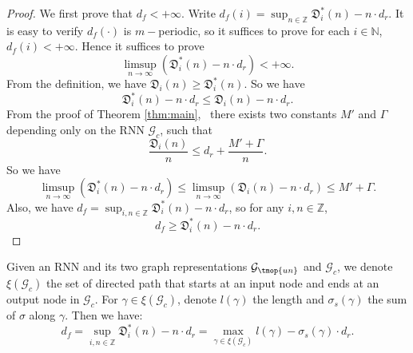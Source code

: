 \begin{proof}
  We first prove that $d_f < + \infty$. Write $d_f (i) = \sup_{n \in
  \mathbb{Z}} \mathfrak{D}_i^{\ast} (n) - n \cdot d_r$. It is easy to verify
  $d_f (\cdot)$ is $m -$periodic, so it suffices to prove for each $i \in
  \mathbb{N}$, $d_f (i) < + \infty$. Hence it suffices to prove
  \[ \limsup_{n \rightarrow \infty} (\mathfrak{D}_i^{\ast} (n) - n \cdot d_r)
     < + \infty. \]
  From the definition, we have
  $\mathfrak{D}_i (n) \geq \mathfrak{D}_i^{\ast} (n).$
  So we have
  \[ \mathfrak{D}_i^{\ast} (n) - n \cdot d_r \leq \mathfrak{D}_i (n) - n
     \cdot d_r. \]
  From the proof of Theorem \ref{thm:main}, \ there exists two constants $M'$ and
  $\Gamma$ depending only on the RNN $\mathcal{G}_c$, such that
  \[ \frac{\mathfrak{D}_i (n)}{n} \leq d_r + \frac{M' + \Gamma}{n}. \]
  So we have
  \[ \limsup_{n \rightarrow \infty} (\mathfrak{D}_i^{\ast} (n) - n \cdot d_r)
     \leq \limsup_{n \rightarrow \infty} (\mathfrak{D}_i (n) - n \cdot d_r)
     \leq M' + \Gamma. \]
  Also, we have $d_f = \sup_{i, n \in \mathbb{Z}} \mathfrak{D}_i^{\ast} (n) -
  n \cdot d_r$, so for any $i, n \in \mathbb{Z}$,
  \[ d_f \geq \mathfrak{D}_i^{\ast} (n) - n \cdot d_r. \]
  
\end{proof}

\begin{thm}
  Given an RNN and its two graph representations $\mathcal{G}_{\tmop{un}}$ and
  $\mathcal{G}_c$, we denote $\xi (\mathcal{G}_c)$ the set of directed path
  that starts at an input node and ends at an output node in $\mathcal{G}_c$.
  For $\gamma \in \xi(\mathcal{G}_c)$, denote $l (\gamma)$ the length and
  $\sigma_s (\gamma)$ the sum of $\sigma$ along $\gamma$. Then we have:
  \[ d_f = \sup_{i, n \in \mathbb{Z}} \mathfrak{D}_i^{\ast} (n) - n \cdot d_r
     = \max_{\gamma \in \xi (\mathcal{G}_c)} l (\gamma) - \sigma_s (\gamma)
     \cdot d_r. \]
\end{thm}

